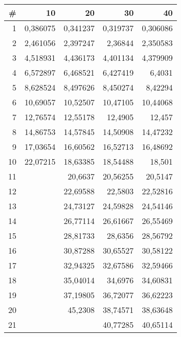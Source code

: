 \begin{tabular}{r|r|r|r|r|}
\hline
   {\bf \#} &   {\bf 10} &   {\bf 20} &   {\bf 30} &   {\bf 40} \\
\hline
         1 &   0,386075 &   0,341237 &   0,319737 &   0,306086 \\
\hline
         2 &   2,461056 &   2,397247 &    2,36844 &   2,350583 \\
\hline
         3 &   4,518931 &   4,436173 &   4,401134 &   4,379909 \\
\hline
         4 &   6,572897 &   6,468521 &   6,427419 &     6,4031 \\
\hline
         5 &   8,628524 &   8,497626 &   8,450274 &    8,42294 \\
\hline
         6 &   10,69057 &   10,52507 &   10,47105 &   10,44068 \\
\hline
         7 &   12,76574 &   12,55178 &    12,4905 &     12,457 \\
\hline
         8 &   14,86753 &   14,57845 &   14,50908 &   14,47232 \\
\hline
         9 &   17,03654 &   16,60562 &   16,52713 &   16,48692 \\
\hline
        10 &   22,07215 &   18,63385 &   18,54488 &     18,501 \\
\hline
        11 &            &    20,6637 &   20,56255 &    20,5147 \\
\hline
        12 &            &   22,69588 &    22,5803 &   22,52816 \\
\hline
        13 &            &   24,73127 &   24,59828 &   24,54146 \\
\hline
        14 &            &   26,77114 &   26,61667 &   26,55469 \\
\hline
        15 &            &   28,81733 &    28,6356 &   28,56792 \\
\hline
        16 &            &   30,87288 &   30,65527 &   30,58122 \\
\hline
        17 &            &   32,94325 &   32,67586 &   32,59466 \\
\hline
        18 &            &   35,04014 &    34,6976 &   34,60831 \\
\hline
        19 &            &   37,19805 &   36,72077 &   36,62223 \\
\hline
        20 &            &    45,2308 &   38,74571 &   38,63648 \\
\hline
        21 &            &            &   40,77285 &   40,65114 \\

\end{tabular}
